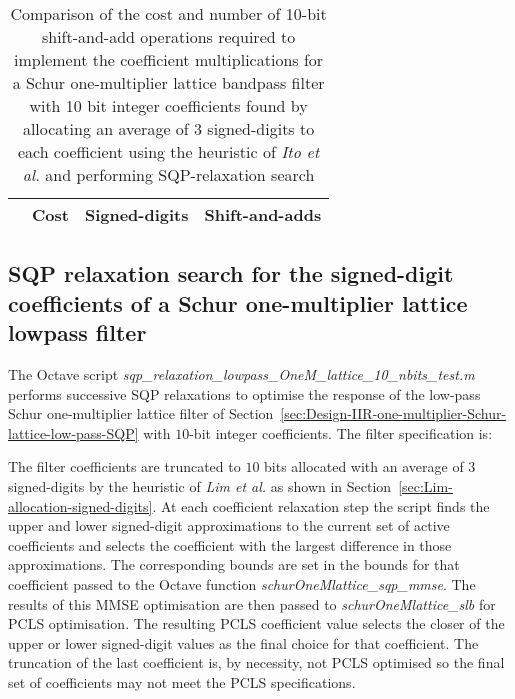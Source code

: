 \documentclass[a4paper,twoside,10pt,english]{report}
\begin{document}
\begin{table}[htb]
\centering
\begin{threeparttable}
\begin{tabular}{lccc}  \\ \toprule
& Cost&Signed-digits&Shift-and-adds\\ \midrule

\bottomrule
\end{tabular}
\end{threeparttable}
\caption[Summary of cost results for the Schur one-multiplier lattice 
bandpass filter SQP-relaxation algorithm example with 10 bit coefficients]
{Comparison of the cost and number of 10-bit shift-and-add operations required 
  to implement the coefficient multiplications for a Schur one-multiplier 
  lattice bandpass filter with 10 bit integer coefficients found by allocating 
  an average of 3 signed-digits to each coefficient using the heuristic of 
  \emph{Ito et al.} and performing SQP-relaxation search}
\label{tab:sqp-relax-schurOneMlattice-bandpass-10-nbits-cost-summary}
\end{table}
\subsection{\label{sec:SQP-relaxation-search-signed-digit-coefficients-lowpass}SQP relaxation search for the signed-digit coefficients of a Schur one-multiplier lattice lowpass filter}
The Octave script 
\emph{sqp\_relaxation\_lowpass\_OneM\_lattice\_10\_nbits\_test.m} performs
successive SQP relaxations to optimise the response of the low-pass Schur
one-multiplier lattice filter of
Section~\ref{sec:Design-IIR-one-multiplier-Schur-lattice-low-pass-SQP} with
$10$-bit integer coefficients. The filter specification is:
\begin{small}

\end{small} 

The filter coefficients are truncated to $10$ bits allocated with an average of
$3$ signed-digits by the heuristic of \emph{Lim et al.} as shown in
Section~\ref{sec:Lim-allocation-signed-digits}.  At each coefficient relaxation
step the script finds the upper and lower signed-digit approximations to the
current set of active coefficients and selects the coefficient with the largest
difference in those approximations. The corresponding bounds are set in the
bounds for that coefficient passed to the Octave function
\emph{schurOneMlattice\_sqp\_mmse}. The results of this MMSE optimisation are
then passed to \emph{schurOneMlattice\_slb} for PCLS optimisation. The resulting
PCLS coefficient value selects the closer of the upper or lower signed-digit
values as the final choice for that coefficient. The truncation of the last
coefficient is, by necessity, not PCLS optimised so the final set of
coefficients may not meet the PCLS specifications.
\end{document}
